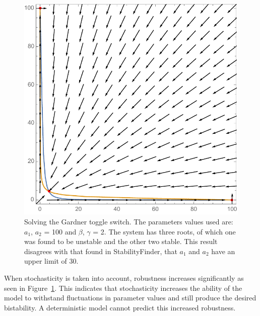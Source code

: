 \begin{figure}[h]
\centering
\includegraphics[scale=0.6]{chapterModelling/images/Gardner/gardner_solve_roots_a1a2_big.pdf}
\caption[Solving the Gardner toggle switch.]{Solving the Gardner toggle switch. The parameters values used are:  $a_1$, $a_2$ = 100 and $\beta$, $\gamma$ = 2. The system has three roots, of which one was found to be unstable and the other two stable. This result disagrees with that found in StabilityFinder, that $a_1$ and $a_2$ have an upper limit of 30.}
\label{fig:Gard_robst}
\end{figure}

 When stochasticity is taken into account, robustness increases significantly as seen in Figure~\ref{fig:Gard_robst}. This indicates that stochasticity increases the ability of the model to withstand fluctuations in parameter values and still produce the desired bistability. A deterministic model cannot predict this increased robustness.
 
